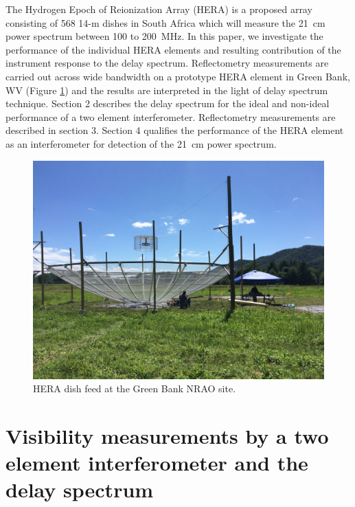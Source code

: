 \documentclass[twocolumn]{emulateapj}
\begin{document}
The Hydrogen Epoch of Reionization Array (HERA) is a proposed array consisting of 568 14-m dishes in South Africa which will measure the 21~cm power spectrum between 100 to 200~MHz.
In this paper, we investigate the performance of the individual HERA elements and resulting contribution of the instrument response to the delay spectrum.
 Reflectometry measurements  are carried out across wide bandwidth on a prototype HERA element in Green
Bank, WV (Figure \ref{fig:heradish}) and the results are interpreted in the light of delay spectrum technique. Section 2 describes the delay spectrum for the ideal and non-ideal performance of a two element interferometer. Reflectometry measurements are described in section 3. Section 4 qualifies the performance of the HERA element as an interferometer for detection of the 21~cm power spectrum.


\begin{figure}
\centering
\includegraphics[trim={2cm 20cm 30cm 15cm},clip, totalheight=0.3\textheight]{plots/heradish.jpg}
\caption{HERA dish feed at the Green Bank NRAO site.}
\label{fig:heradish}
\end{figure}

\section{Visibility measurements by a two element interferometer and the delay spectrum}
\end{document}
